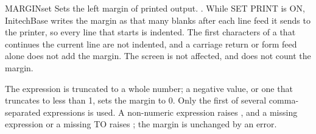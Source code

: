 \begin{XbaseEntry}{MARGIN}{set}
Sets the left margin of printed output.
\Syntax
{}
.
\Usage
While SET PRINT is ON, InitechBase writes the margin as that many blanks after
each line feed it sends to the printer, so every line that  starts is
indented.  The first characters of a  that continues the current line
are not indented, and a carriage return or form feed alone does not add the
margin.  The screen is not affected, and  does not count the margin.

The expression is truncated to a whole number; a negative value, or one that
truncates to less than 1, sets the margin to 0.  Only the first of several
comma-separated expressions is used.  A non-numeric expression raises
, and a missing expression or a missing TO
raises ; the margin is unchanged by an error.
\end{XbaseEntry}
